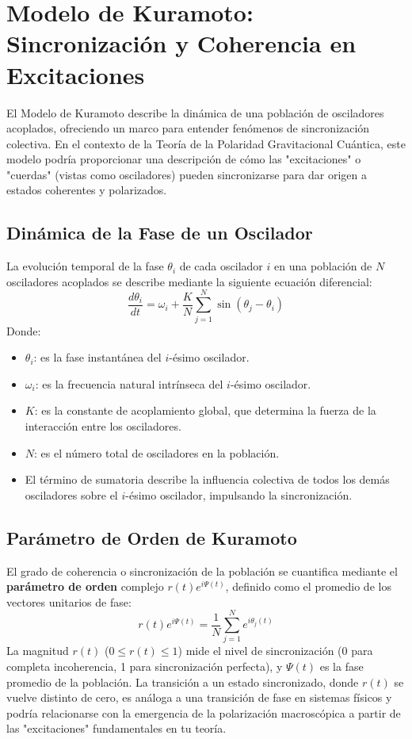 \documentclass{book}
\begin{document}
\section*{Modelo de Kuramoto: Sincronización y Coherencia en Excitaciones}
\label{sec:kuramoto_model}

El Modelo de Kuramoto describe la dinámica de una población de osciladores acoplados, ofreciendo un marco para entender fenómenos de sincronización colectiva. En el contexto de la Teoría de la Polaridad Gravitacional Cuántica, este modelo podría proporcionar una descripción de cómo las "excitaciones" o "cuerdas" (vistas como osciladores) pueden sincronizarse para dar origen a estados coherentes y polarizados.

\subsection*{Dinámica de la Fase de un Oscilador}
La evolución temporal de la fase $\theta_i$ de cada oscilador $i$ en una población de $N$ osciladores acoplados se describe mediante la siguiente ecuación diferencial:
\begin{equation}
    \frac{d\theta_i}{dt} = \omega_i + \frac{K}{N} \sum_{j=1}^{N} \sin(\theta_j - \theta_i)
    \label{eq:kuramoto_main}
\end{equation}
Donde:
\begin{itemize}
    \item $\theta_i$: es la fase instantánea del $i$-ésimo oscilador.
    \item $\omega_i$: es la frecuencia natural intrínseca del $i$-ésimo oscilador.
    \item $K$: es la constante de acoplamiento global, que determina la fuerza de la interacción entre los osciladores.
    \item $N$: es el número total de osciladores en la población.
    \item El término de sumatoria describe la influencia colectiva de todos los demás osciladores sobre el $i$-ésimo oscilador, impulsando la sincronización.
\end{itemize}

\subsection*{Parámetro de Orden de Kuramoto}
El grado de coherencia o sincronización de la población se cuantifica mediante el \textbf{parámetro de orden} complejo $r(t)e^{i\Psi(t)}$, definido como el promedio de los vectores unitarios de fase:
\begin{equation}
    r(t)e^{i\Psi(t)} = \frac{1}{N} \sum_{j=1}^{N} e^{i\theta_j(t)}
    \label{eq:kuramoto_order_parameter}
\end{equation}
La magnitud $r(t)$ ($0 \le r(t) \le 1$) mide el nivel de sincronización (0 para completa incoherencia, 1 para sincronización perfecta), y $\Psi(t)$ es la fase promedio de la población. La transición a un estado sincronizado, donde $r(t)$ se vuelve distinto de cero, es análoga a una transición de fase en sistemas físicos y podría relacionarse con la emergencia de la polarización macroscópica a partir de las "excitaciones" fundamentales en tu teoría.
\end{document}
